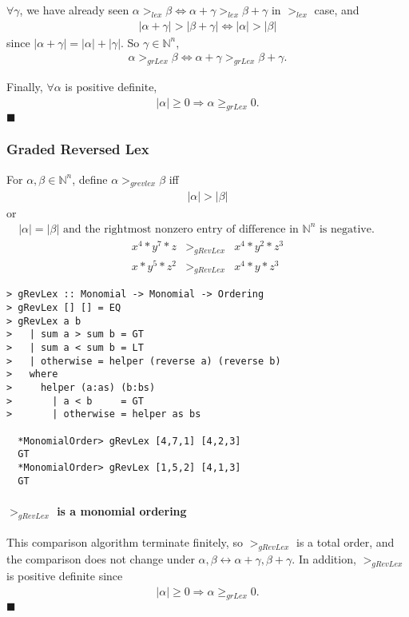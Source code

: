\documentclass[11pt]{book}
\begin{document}
$\forall \gamma$, we have already seen $\alpha >_{lex} \beta \Leftrightarrow \alpha + \gamma >_{lex} \beta + \gamma$ in $>_{lex}$ case, and
\begin{eqnarray}
|\alpha + \gamma| > |\beta + \gamma| \Leftrightarrow |\alpha| > |\beta|
\end{eqnarray}
since $|\alpha + \gamma| = |\alpha| + |\gamma|$.
So $\gamma \in \mathbb{N}^n$,
\begin{eqnarray}
\alpha >_{grLex} \beta \Leftrightarrow \alpha + \gamma >_{grLex} \beta + \gamma.
\end{eqnarray}

Finally, $\forall \alpha$ is positive definite,
\begin{eqnarray}
|\alpha| \geq 0 \Rightarrow \alpha \geq_{grLex} 0.
\end{eqnarray}
$\blacksquare$

\subsubsection{Graded Reversed Lex}
For $\alpha, \beta \in \mathbb{N}^n$, define $\alpha >_{grevlex} \beta$ iff
\begin{eqnarray}
|\alpha| > |\beta|
\end{eqnarray}
or
\begin{eqnarray}
|\alpha| = |\beta| \text{ and the rightmost nonzero entry of difference in $\mathbb{N}^n$ is negative.}  \qquad
\end{eqnarray}
\begin{eqnarray}
x^4 * y^7 * z &>_{gRevLex}& x^4 * y^2 * z^3 \\
x * y^5 * z^2 &>_{gRevLex}& x^4 * y * z^3
\end{eqnarray}

\begin{verbatim}
> gRevLex :: Monomial -> Monomial -> Ordering
> gRevLex [] [] = EQ
> gRevLex a b
>   | sum a > sum b = GT
>   | sum a < sum b = LT
>   | otherwise = helper (reverse a) (reverse b)
>   where
>     helper (a:as) (b:bs) 
>       | a < b     = GT
>       | otherwise = helper as bs

  *MonomialOrder> gRevLex [4,7,1] [4,2,3]
  GT
  *MonomialOrder> gRevLex [1,5,2] [4,1,3]
  GT
\end{verbatim}

\paragraph{$>_{gRevLex}$ is a monomial ordering}
This comparison algorithm terminate finitely, so $>_{gRevLex}$ is a total order, and the comparison does not change under $\alpha, \beta \leftrightarrow \alpha + \gamma, \beta + \gamma$.
In addition, $>_{gRevLex}$ is positive definite since
\begin{eqnarray}
|\alpha| \geq 0 \Rightarrow \alpha \geq_{grLex} 0.
\end{eqnarray}
$\blacksquare$
\end{document}
